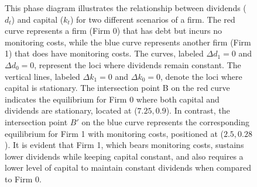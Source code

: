 \documentclass[12pt]{report}
\begin{document}
\begin{figure}
    \caption{This phase diagram illustrates the relationship between dividends (\(d_t\)) and capital (\(k_t\)) for two different
    scenarios of a firm. The red curve represents a firm (Firm 0) that has debt but incurs no monitoring costs, while
    the blue curve represents another firm (Firm 1) that does have monitoring costs. The curves, labeled
    \(\Delta d_1 = 0\) and \(\Delta d_0 = 0\), represent the loci where dividends remain constant. The vertical lines,
    labeled \(\Delta k_1 = 0\) and \(\Delta k_0 = 0\), denote the loci where capital is
    stationary. The intersection point B on the red curve indicates the equilibrium for Firm 0 where both capital and
    dividends are stationary, located at (\(7.25, 0.9\)). In contrast, the intersection point \(B'\) on the blue curve
    represents the corresponding equilibrium for Firm 1 with monitoring costs, positioned at (\(2.5, 0.28\)). It is
    evident that Firm 1, which bears monitoring costs, sustains lower dividends while keeping capital constant, and also
    requires a lower level of capital to maintain constant dividends when compared to Firm 0.}
    \label{pl_phase_b}
\end{figure}
        
        
        
       
        
\end{document}
